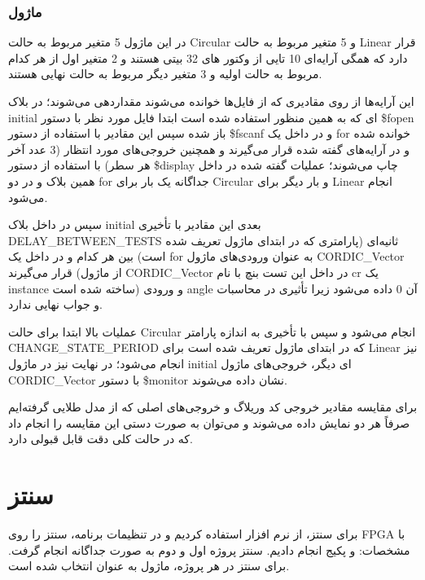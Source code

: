 \documentclass[12pt,titlepage,a4page , tikz , multi,table , svgnames,xcdraw]{article}
\begin{document}
\subsubsection{ماژول }



در این ماژول 5 متغیر مربوط به حالت Circular و 5 متغیر مربوط به حالت Linear قرار دارد که همگی آرایه‌ای 10 تایی از وکتور های 32 بیتی هستند و 2 متغیر اول از هر کدام مربوط به حالت اولیه و 3 متغیر دیگر مربوط به حالت نهایی هستند.


این آرایه‌ها از روی مقادیری که از فایل‌ها خوانده می‌شوند مقداردهی می‌شوند؛ در بلاک initial ای که به همین منظور استفاده شده است ابتدا فایل مورد نظر با دستور \$fopen باز شده سپس این مقادیر با استفاده از دستور \$fscanf و در داخل یک for خوانده شده و در آرایه‌های گفته شده قرار می‌گیرند و همچنین خروجی‌های مورد انتظار (3 عدد آخر هر سطر) با استفاده از دستور \$display چاپ می‌شوند؛ عملیات گفته شده در داخل همین بلاک و در دو for جداگانه یک بار برای Circular و بار دیگر برای Linear انجام می‌شود.


سپس در داخل بلاک initial بعدی این مقادیر با تأخیری DELAY\_BETWEEN\_TESTS ثانیه‌ای (پارامتری که در ابتدای ماژول تعریف شده است) بین هر کدام و در داخل یک for به عنوان ورودی‌های ماژول CORDIC\_Vector قرار می‌گیرند (از ماژول CORDIC\_Vector در داخل این تست بنچ با نام cr یک instance ساخته شده است) و ورودی angle آن 0 داده می‌شود زیرا تأثیری در محاسبات و جواب نهایی ندارد.


عملیات بالا ابتدا برای حالت Circular انجام می‌شود و سپس با تأخیری به اندازه پارامتر CHANGE\_STATE\_PERIOD که در ابتدای ماژول تعریف شده است برای Linear نیز انجام می‌شود؛ در نهایت نیز در ماژول initial ای دیگر، خروجی‌های ماژول CORDIC\_Vector با دستور \$monitor نشان داده می‌شوند.


برای مقایسه مقادیر خروجی کد وریلاگ و خروجی‌های اصلی که از مدل طلایی گرفته‌ایم صرفاً هر دو نمایش داده می‌شوند و می‌توان به صورت دستی این مقایسه را انجام داد که در حالت کلی دقت قابل قبولی دارد.


\newpage


\section{سنتز}

برای سنتز، از نرم افزار  استفاده کردیم و در تنظیمات برنامه، سنتز را روی FPGA با مشخصات:  و پکیج  انجام دادیم. سنتز پروژه اول و دوم به صورت جداگانه انجام گرفت. برای سنتز در هر پروژه، ماژول  به عنوان  انتخاب شده است.
\end{document}
